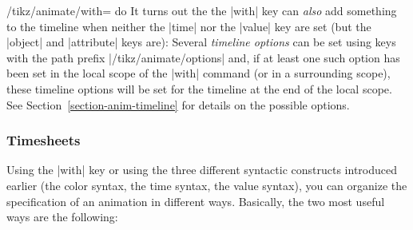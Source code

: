 \begin{key}{/tikz/animate/with= do }
  It turns out the the |with| key can \emph{also} add something to the
  timeline when neither the |time| nor the |value| key are set (but
  the |object| and  |attribute| keys are): Several \emph{timeline
    options} can be set using keys with the path prefix
  |/tikz/animate/options| and, if at least one such option has been
  set in the local scope of the |with| command (or in a surrounding
  scope), these timeline options will be set for the timeline at the
  end of the local scope. See Section~\ref{section-anim-timeline} for
  details on the possible options.
\end{key}




\subsubsection{Timesheets}

Using the |with| key or using the three different syntactic constructs
introduced earlier (the color syntax, the time syntax, the value
syntax), you can organize the specification of an animation in
different ways. Basically, the two most useful ways are the following:

